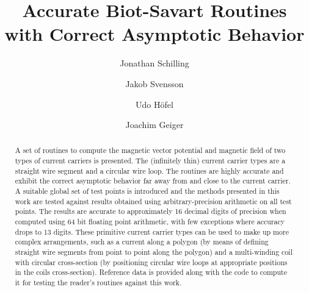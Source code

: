 \documentclass[preprint,12pt]{elsarticle}
\begin{document}
\begin{frontmatter}



\title{Accurate Biot-Savart Routines with Correct Asymptotic Behavior}


\author[a]{Jonathan Schilling}
\author[a]{Jakob Svensson}
\author[a]{Udo Höfel}
\author[a]{Joachim Geiger}

\address[a]{Max-Planck-Institute for Plasma Physics, Wendelsteinstrasse 1, 17491 Greifswald, Germany}

\begin{abstract}
A set of routines to compute the magnetic vector potential and magnetic field of two types of current carriers is presented.
The (infinitely thin) current carrier types are a straight wire segment and a circular wire loop.
The routines are highly accurate and exhibit the correct asymptotic behavior far away from and close to the current carrier.
A suitable global set of test points is introduced and the methods presented in this work
are tested against results obtained using arbitrary-precision arithmetic on all test points.
The results are accurate to approximately 16 decimal digits of precision when computed using 64 bit floating point arithmetic,
with few exceptions where accuracy drops to 13 digits.
These primitive current carrier types can be used to make up more complex arrangements,
such as a current along a polygon (by means of defining straight wire segments from point to point along the polygon)
and a multi-winding coil with circular cross-section (by positioning circular wire loops at appropriate positions in the coils cross-section).
Reference data is provided along with the code to compute it
for testing the reader's routines against this work.
\end{abstract}


\end{frontmatter}
\end{document}
